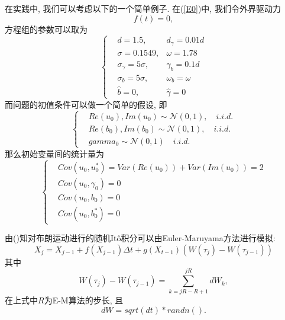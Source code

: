 \documentclass[notitlepage,cs4size,punct,oneside]{ctexrep}
\numberwithin{equation}{section}
\theoremstyle{mystyle}
\begin{document}
在实践中, 我们可以考虑以下的一个简单例子. 在(\ref{E0})中, 我们令外界驱动力
$$f(t) = 0,$$方程组的参数可以取为
\begin{equation} \label{parameters}
\left\{
\begin{aligned}
&d = 1.5,  &d_\gamma = 0.01d\\
&\sigma = 0.1549,& \omega = 1.78 \\
&\sigma_\gamma = 5\sigma, &\gamma_b = 0.1d \\
&\sigma_b = 5\sigma, &\omega_b = \omega \\
&\hat{b} = 0, &\hat\gamma = 0
\end{aligned}
\right.
\end{equation}
而问题的初值条件可以做一个简单的假设, 即
\begin{equation}
\left\{
\begin{aligned}
&Re(u_0), Im(u_0) \sim \mathcal{N}(0, 1), \quad i.i.d. \\
&Re(b_0), Im(b_0) \sim \mathcal{N}(0, 1), \quad i.i.d. \\
&gamma_0 \sim \mathcal{N}(0, 1) \quad i.i.d.
\end{aligned}
\right.
\end{equation}
那么初始变量间的统计量为
\begin{equation}
\left\{
\begin{aligned}
&Cov(u_0, u_0^*) = Var(Re(u_0))+Var(Im(u_0)) = 2 \\
&Cov(u_0, \gamma_0) = 0 \\
&Cov(u_0, b_0) = 0 \\
&Cov(u_0, b_0^*) = 0
\end{aligned}
\right.
\end{equation}

由(\cite{higham2001algorithmic})知对布朗运动进行的随机It\^o积分可以由Euler-Maruyama方法进行模拟:
\begin{equation}
X_j = X_{j-1}+f(X_{j-1})\Delta t+g(X_{t-1})(W(\tau_j) - W(\tau_{j-1}))
\end{equation}
其中
$$
W(\tau_j) - W(\tau_{j-1}) = \sum_{k = jR-R+1}^{jR} dW_k,
$$
在上式中$R$为E-M算法的步长, 且
$$
dW = sqrt(dt)*randn().
$$


\end{document}
